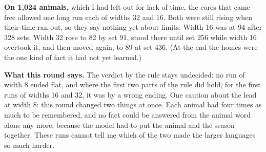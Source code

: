 \textbf{On 1,024 animals,} which I had left out for lack of time, the cores that came free
allowed one long run each of widths 32 and 16. Both were still rising when their time ran out,
so they say nothing yet about limits. Width 16 was at 94 after 328 sets. Width 32 rose to 82
by set 91, stood there until set 256 while width 16 overtook it, and then moved again, to 89
at set 436. (At the end the homes were the one kind of fact it had not yet learned.)

\textbf{What this round says.} The verdict by the rule stays undecided: no run of width 8
ended flat, and where the first two parts of the rule did hold, for the first runs of widths
16 and 32, it was by a wrong ending. One caution about the lead at width 8: this round changed two things
at once. Each animal had four times as much to be remembered, and no fact could be answered
from the animal word alone any more, because the model had to put the animal and the season
together. These runs cannot tell me which of the two made the larger languages so much harder.
